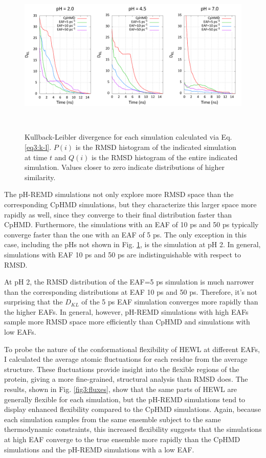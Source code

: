 \begin{figure}
 \includegraphics[width=6.5in, height=3.05in]{Kullback_Leibler.png}
 \caption{Kullback-Leibler divergence for each simulation calculated via Eq.
          \ref{eq3:k-l}.  $P(i)$ is the RMSD histogram of the indicated
          simulation at time $t$ and $Q(i)$ is the RMSD histogram of the entire
          indicated simulation.  Values closer to zero indicate distributions of
          higher similarity.}
 \label{fig3:kullback-leibler}
\end{figure}

The pH-REMD simulations not only explore more RMSD space than the corresponding
CpHMD simulations, but they characterize this larger space more rapidly as well,
since they converge to their final distribution faster than CpHMD.  Furthermore,
the simulations with an EAF of 10 ps and 50 ps typically
converge faster than the one with an EAF of 5 ps.  The only exception
in this case, including the pHs not shown in Fig. \ref{fig3:kullback-leibler},
is the simulation at pH 2.  In general, simulations with EAF 10 ps and
50 ps are indistinguishable with respect to RMSD.

At pH 2, the RMSD distribution of the EAF=5 ps simulation is much
narrower than the corresponding distributions at EAF 10 ps and 50
ps.  Therefore, it's not surprising that the $D_{KL}$ of the 5
ps EAF simulation converges more rapidly than the higher EAFs.  In
general, however, pH-REMD simulations with high EAFs sample more RMSD space more
efficiently than CpHMD and simulations with low EAFs.

To probe the nature of the conformational flexibility of HEWL at different EAFs,
I calculated the average atomic fluctuations for each residue from the average
structure. These fluctuations provide insight into the flexible regions of the
protein, giving a more fine-grained, structural analysis than RMSD does.  The
results, shown in Fig. \ref{fig3:fluxes}, show that the same parts of HEWL are
generally flexible for each simulation, but the pH-REMD simulations tend to
display enhanced flexibility compared to the CpHMD simulations.  Again, because
each simulation samples from the same ensemble subject to the same thermodynamic
constraints, this increased flexibility suggests that the simulations at high
EAF converge to the true ensemble more rapidly than the CpHMD simulations and
the pH-REMD simulations with a low EAF.


